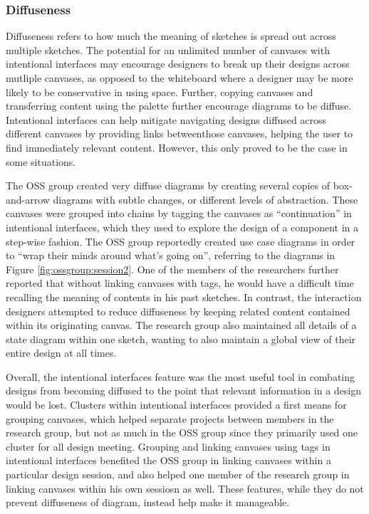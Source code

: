 
\subsubsection{Diffuseness}
Diffuseness refers to how much the meaning of sketches is spread out across multiple sketches. The potential for an unlimited number of canvases with intentional interfaces may encourage designers to break up their designs across mutliple canvases, as opposed to the whiteboard where a designer may be more likely to be conservative in using space. Further, copying canvases and transferring content using the palette further encourage diagrams to be diffuse. Intentional interfaces can help mitigate navigating designs diffused across different canvases by providing links betweenthose  canvases, helping the user to find immediately relevant content.  However, this only proved to be the case in some situations. 

The OSS group created very diffuse diagrams by creating several copies of box-and-arrow diagrams with subtle changes, or different levels of abstraction. These canvases were grouped into chains by tagging the canvases as ``continuation'' in intentional interfaces, which they used to explore the design of a component in a step-wise fashion. The OSS group reportedly created use case diagrams in order to ``wrap their minds around what's going on'', referring to the diagrams in Figure \ref{fig:ossgroup:session2}. One of the members of the researchers further reported that without linking canvases with tags, he would have a difficult time recalling the meaning of contents in his past sketches. In contrast, the interaction designers attempted to reduce diffuseness by keeping related content contained within its originating canvas. The research group also maintained all details of a state diagram within one sketch, wanting to also maintain a global view of their entire design at all times.

Overall, the intentional interfaces feature was the most useful tool in combating designs from becoming diffused to the point that relevant information in a design would be lost. Clusters within intentional interfaces provided a first means for grouping canvases, which helped separate projects between members in the research group, but not as much in the OSS group since they primarily used one cluster for all design meeting. Grouping and linking canvases using tags in intentional interfaces benefited the OSS group in linking canvases within a particular design session, and also helped one member of the research group in linking canvases within his own sessiosn as well. These features, while they do not prevent diffuseness of diagram, instead help make it manageable.

